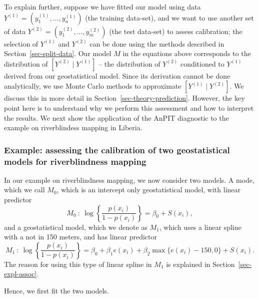 \documentclass[
  letterpaper,
]{krantz}
\begin{document}
To explain further, suppose we have fitted our model using data
\(Y^{(1)} = \left( y^{(1)}_{1}, \ldots, y^{(1)}_{n} \right)\) (the
training data-set), and we want to use another set of data
\(Y^{(2)} = \left( y^{(2)}_{1}, \ldots, y^{(2)}_{m} \right)\) (the test
data-set) to assess calibration; the selection of \(Y^{(1)}\) and
\(Y^{(2)}\) can be done using the methods described in
Section~\ref{sec-split-data}. Our model \(M\) in the equations above
corresponds to the distribution of
\(\left[ Y^{(2)} \mid Y^{(1)} \right]\) -- the distribution of
\(Y^{(2)}\) conditioned to \(Y^{(1)}\) derived from our geostatistical
model. Since its derivation cannot be done analytically, we use Monte
Carlo methods to approximate \(\left[ Y^{(1)} \mid Y^{(2)} \right]\). We
discuss this in more detail in Section~\ref{sec-theory-prediction}.
However, the key point here is to understand why we perform this
assessment and how to interpret the results. We next show the
application of the AnPIT diagnostic to the example on riverblindess
mapping in Liberia.

\subsubsection{Example: assessing the calibration of two geostatistical
models for riverblindness mapping}\label{sec-liberia-anpit}

In our example on riverblindness mapping, we now consider two models. A
mode, which we call \(M_{0}\), which is an intercept only geostatistical
model, with linear predictor \[
M_{0} \: : \: \log\left\{\frac{p(x_i)}{1-p(x_i)}\right\} = \beta_0 + S(x_i) ,
\] and a geostatistical model, which we denote as \(M_{1}\), which uses
a linear spline with a not in 150 meters, and has linear predictor \[
M_{1} \: : \: \log\left\{\frac{p(x_i)}{1-p(x_i)}\right\} = \beta_0 + \beta_{1}e(x_i) + \beta_{2}\max\{e(x_i) - 150, 0\} + S(x_i).
\] The reason for using this type of linear spline in \(M_{1}\) is
explained in Section~\ref{sec-expl-assoc}.

Hence, we first fit the two models.
\end{document}
